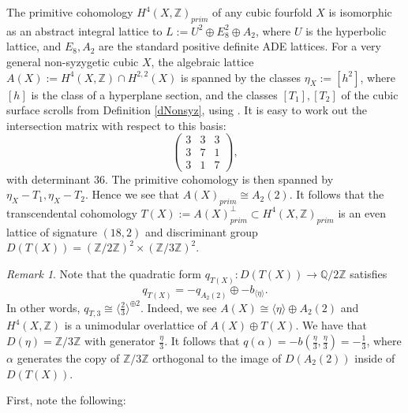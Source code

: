 \documentclass[11pt]{amsart}
\theoremstyle{plain}
\numberwithin{equation}{section}
\theoremstyle{definition}
\theoremstyle{remark}
\newtheorem{remark}[theorem]{Remark}
\newcommand{\bQ}{\mathbb{Q}}
\newcommand{\bZ}{\mathbb{Z}}
\begin{document}
\medskip
The primitive cohomology $H^4(X,\bZ)_{prim}$ of any cubic fourfold $X$ is isomorphic as an abstract integral lattice to $L:=U^2\oplus E_8^2\oplus A_2$, where $U$ is the hyperbolic lattice, and $E_8, A_2$ are the standard positive definite ADE lattices.
For a very general non-syzygetic cubic $X$, the algebraic lattice $A(X):=H^4(X,\bZ)\cap H^{2,2}(X)$ is spanned by the classes $\eta_X:=[h^2]$, where $[h]$ is the class of a hyperplane section, and the classes $[T_1], [T_2]$ of the cubic surface scrolls from Definition \ref{dNonsyz}, using \cite[Thm. 1.1]{laz09}. It is easy to work out the intersection matrix with respect to this basis:
\[\left(\begin{matrix}
    3 & 3& 3\\
    3 & 7 & 1\\
    3 & 1 & 7
\end{matrix}\right),\] with determinant $36$. The primitive cohomology is then spanned by $\eta_X-T_1, \eta_X-T_2$. Hence we see that $A(X)_{prim}\cong A_2(2)$. It follows that the transcendental cohomology $T(X):=A(X)_{prim}^\perp\subset H^4(X,\bZ)_{prim}$ is an even lattice of signature $(18,2)$ and discriminant group $D(T(X))=(\bZ/2\bZ)^2\times (\bZ/3\bZ)^2.$

\begin{remark}\label{remark: q for T}
Note that the quadratic form $q_{T(X)}:D(T(X))\rightarrow \bQ/2\bZ$ satisfies $$q_{T(X)}=-q_{A_2(2)}\oplus -b_{\langle \eta\rangle}.$$ In other words, $q_{T,3}\cong \langle \frac{2}{3}\rangle^{\oplus 2}$. Indeed,  we see $A(X)\cong \langle \eta\rangle \oplus A_2(2)$ and $H^4(X,\bZ)$ is a unimodular overlattice of $A(X)\oplus T(X)$. We have that $D(\eta)=\bZ/3\bZ$ with generator $\frac{\eta}{3}.$ It follows that $q(\alpha)=-b(\frac{\eta}{3},\frac{\eta}{3})=-\frac{1}{3}$, where $\alpha$ generates the copy of $\bZ/3\bZ$ orthogonal to the image of $D(A_2(2))$ inside of $D(T(X)).$ 
\end{remark}
\medskip

First, note the following:
\end{document}
